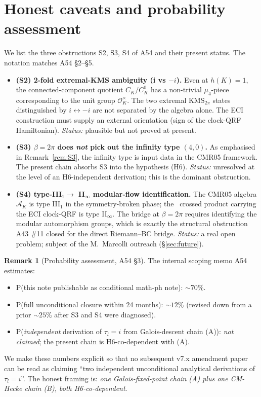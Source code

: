 \documentclass[12pt]{amsart}
\theoremstyle{definition}
\newtheorem{remark}[theorem]{Remark}
\newcommand{\OK}{\mathcal{O}_K}
\newcommand{\DEHK}{\mathrm{DEHK}}
\begin{document}
\section{Honest caveats and probability assessment}
\label{sec:caveats}

We list the three obstructions S2, S3, S4 of A54 and their
present status. The notation matches A54 \S2--\S5.

\begin{itemize}
\item \textbf{(S2) 2-fold extremal-KMS ambiguity (i vs $-i$).}
  Even at $h(K) = 1$, the connected-component quotient
  $C_K / C_K^0$ has a non-trivial $\mu_4$-piece corresponding to
  the unit group $\OK^\times$. The two extremal KMS$_{2\pi}$
  states distinguished by $i \leftrightarrow -i$ are not separated
  by the algebra alone. The ECI construction must supply an
  external orientation (sign of the clock-QRF Hamiltonian).
  \emph{Status:} plausible but not proved at present.

\item \textbf{(S3) $\beta = 2\pi$ does \emph{not} pick out the
  infinity type $(4, 0)$.} As emphasised in
  Remark~\ref{rem:S3}, the infinity type is input data in the
  CMR05 framework. The present chain absorbs S3 into the
  hypothesis (H6). \emph{Status:} unresolved at the level of an
  H6-independent derivation; this is the dominant obstruction.

\item \textbf{(S4) type-III${}_1 \to$ II${}_\infty$
  modular-flow identification.} The CMR05 algebra
  $\mathcal{A}_K$ is type III${}_1$ in the symmetry-broken phase;
  the \DEHK\ crossed product carrying the ECI clock-QRF is
  type II${}_\infty$. The bridge at $\beta = 2\pi$ requires
  identifying the modular automorphism groups, which is exactly
  the structural obstruction A43 \#11 closed for the direct
  Riemann--BC bridge. \emph{Status:} a real open problem; subject
  of the M.~Marcolli outreach (\S\ref{sec:future}).
\end{itemize}

\begin{remark}[Probability assessment, A54 \S3]
The internal scoping memo A54 estimates:
\begin{itemize}
\item P(this note publishable as conditional math-ph note): $\sim
  70\%$.
\item P(full unconditional closure within 24 months): $\sim 12\%$
  (revised down from a prior $\sim 25\%$ after S3 and S4 were
  diagnosed).
\item P(\emph{independent} derivation of $\tau_l = i$ from
  Galois-descent chain (A)): \emph{not claimed}; the present
  chain is H6-co-dependent with (A).
\end{itemize}
We make these numbers explicit so that no subsequent v7.x
amendment paper can be read as claiming ``two independent
unconditional analytical derivations of $\tau_l = i$''. The honest
framing is: \emph{one Galois-fixed-point chain (A) plus one
CM-Hecke chain (B), both H6-co-dependent}.
\end{remark}
\end{document}
